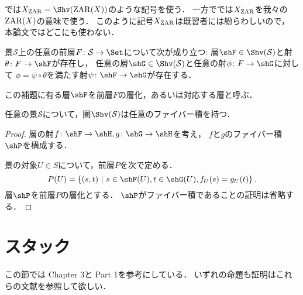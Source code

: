     \cite{Olsson16}では$X_{\ZAR}=\Shv(\ZAR(X))$のような記号を使う．
    一方で\cite{SP}では$X_{\mathrm{ZAR}}$を我々の$\mathrm{ZAR}(X)$の意味で使う．
    このように記号$X_{\mathrm{ZAR}}$は既習者には紛らわしいので，
    本論文ではどこにも使わない．

    \begin{Lemma}[層化; sheafification]
        景$\mathcal{S}$上の任意の前層$F \colon \mathcal{S} \to \Set$について次が成り立つ:
        層$\shF \in \Shv(\mathcal{S})$と射$\theta \colon F \to \shF$が存在し，
        任意の層$\shG \in \Shv(\mathcal{S})$と任意の射$\phi \colon F \to \shG$に対して
        $\phi=\psi \circ \theta$を満たす射$\psi \colon \shF \to \shG$が存在する．
    \end{Lemma}
    この補題に有る層$\shF$を前層$F$の層化，あるいは対応する層と呼ぶ．

    \begin{Lemma}[層のファイバー積]
        任意の景$\mathcal{S}$について，圏$\Shv(\mathcal{S})$は任意のファイバー積を持つ．
    \end{Lemma}
    \begin{proof}
        層の射$f \colon \shF \to \shH, g \colon \shG \to \shH$を考え，
        $f$と$g$のファイバー積$\shP$を構成する．
        
        景の対象$U \in S$について，前層$P$を次で定める．
        \[ P(U)=\left\{ (s,t) \ \middle|\ s \in \shF(U), t \in \shG(U), f_U(s)=g_U(t) \right\}. \]
        層$\shP$を前層$P$の層化とする．
        $\shP$がファイバー積であることの証明は省略する．
    \end{proof}

\section{スタック}
この節では\cite{Olsson16} Chapter 3と\cite{FGAexp} Part 1を参考にしている．
いずれの命題も証明はこれらの文献を参照して欲しい．

